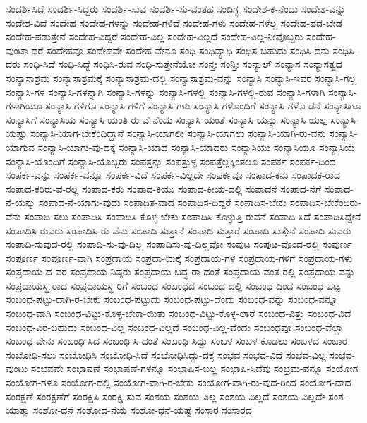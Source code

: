 {ಸಂದರ್ಶಿಸಿದೆ
ಸಂದರ್ಶಿ-ಸಿದ್ದರು
ಸಂದರ್ಶಿ-ಸುವ
ಸಂದರ್ಶಿ-ಸು-ವಂತಹ
ಸಂದಿಗ್ಧ
ಸಂದೇಶ-ಕ-ನೆಂದು
ಸಂದೇಶ-ವನ್ನು
ಸಂದೇಶ-ವಿದೆ
ಸಂದೇಹ
ಸಂದೇಹ-ಗಳನ್ನು
ಸಂದೇಹ-ಗಳಿವೆ
ಸಂದೇಹ-ಗಳು
ಸಂದೇಹ-ಗಳೆಲ್ಲ
ಸಂದೇಹ-ಪಡ-ಬೇಡ
ಸಂದೇಹ-ಪಡುತ್ತೇನೆ
ಸಂದೇಹ-ವಿದ್ದರೆ
ಸಂದೇಹ-ವಿಲ್ಲ
ಸಂದೇಹ-ವಿಲ್ಲದೆ
ಸಂದೇಹ-ವಿಲ್ಲ-ನೀವೊಬ್ಬರು
ಸಂದೇಹ-ವುಂಟಾ-ದರೆ
ಸಂದೇಹವೂ
ಸಂದೇಹವೇ
ಸಂದೇಹ-ವೇನೂ
ಸಂಧಿ
ಸಂಧಿವ್ಯಾಧಿ
ಸಂಧಿಸ-ಬಹುದು
ಸಂಧಿಸಿ-ದನು
ಸಂಧಿಸಿ-ದರು
ಸಂಧಿ-ಸಿದೆ
ಸಂಧಿ-ಸಿದ್ದೆ
ಸಂಧಿಸಿ-ರುವ
ಸಂಧಿ-ಸುತ್ತೇನೆಯೋ
ಸಂನ್ತಃ
ಸಂನ್ತಿಃ
ಸಂನ್ಯಾಲ್
ಸಂನ್ಯಾಸ
ಸಂನ್ಯಾಸತ್ವದ
ಸಂನ್ಯಾಸಾಶ್ರಮ
ಸಂನ್ಯಾಸಾಶ್ರಮಕ್ಕೆ
ಸಂನ್ಯಾಸಾಶ್ರಮ-ದಲ್ಲಿ
ಸಂನ್ಯಾಸಾಶ್ರಮ-ವನ್ನು
ಸಂನ್ಯಾಸಿ
ಸಂನ್ಯಾಸಿ-ಇವರ
ಸಂನ್ಯಾಸಿ-ಗಲ್ಲ
ಸಂನ್ಯಾಸಿ-ಗಳ
ಸಂನ್ಯಾಸಿ-ಗಳನ್ನಾಗಿ
ಸಂನ್ಯಾಸಿ-ಗಳನ್ನು
ಸಂನ್ಯಾಸಿ-ಗಳಲ್ಲಿ
ಸಂನ್ಯಾಸಿ-ಗಳಲ್ಲಿ-ರುವ
ಸಂನ್ಯಾಸಿ-ಗಳಾಗಿ
ಸಂನ್ಯಾಸಿ-ಗಳಾಗಿಯೂ
ಸಂನ್ಯಾಸಿ-ಗಳಿಗೂ
ಸಂನ್ಯಾಸಿ-ಗಳಿಗೆ
ಸಂನ್ಯಾಸಿ-ಗಳು
ಸಂನ್ಯಾಸಿ-ಗಳೊಂದಿಗೆ
ಸಂನ್ಯಾಸಿ-ಗಳೊ-ಡನೆ
ಸಂನ್ಯಾಸಿಗೂ
ಸಂನ್ಯಾಸಿಗೆ
ಸಂನ್ಯಾಸಿಯ
ಸಂನ್ಯಾಸಿ-ಯಂತಿ-ರು-ವೆ-ನೆಂದು
ಸಂನ್ಯಾಸಿ-ಯಂತೆ
ಸಂನ್ಯಾಸಿ-ಯನ್ನು
ಸಂನ್ಯಾಸಿ-ಯಲ್ಲ
ಸಂನ್ಯಾಸಿ-ಯಷ್ಟು
ಸಂನ್ಯಾಸಿ-ಯಾಗ-ಬೇಕೆಂದಿದ್ದಾನೆ
ಸಂನ್ಯಾಸಿ-ಯಾಗಲೀ
ಸಂನ್ಯಾಸಿ-ಯಾಗಲು
ಸಂನ್ಯಾಸಿ-ಯಾಗಿ-ರು-ವನು
ಸಂನ್ಯಾಸಿ-ಯಾಗುವ
ಸಂನ್ಯಾಸಿ-ಯಾಗು-ವು-ದಕ್ಕೆ
ಸಂನ್ಯಾಸಿ-ಯಾದ
ಸಂನ್ಯಾಸಿ-ಯಾದರು
ಸಂನ್ಯಾಸಿಯು
ಸಂನ್ಯಾಸಿಯೂ
ಸಂನ್ಯಾಸಿಯೆ
ಸಂನ್ಯಾಸಿ-ಯೊಂದಿಗೆ
ಸಂನ್ಯಾಸಿ-ಯೊಬ್ಬರು
ಸಂಪತ್ತನ್ನು
ಸಂಪತ್ತುಳ್ಳ
ಸಂಪತ್ತೆಲ್ಲಕ್ಕಿಂತಲೂ
ಸಂಪರ್ಕ
ಸಂಪರ್ಕ-ದಿಂದ
ಸಂಪರ್ಕ-ವನ್ನು
ಸಂಪರ್ಕ-ವನ್ನೂ
ಸಂಪರ್ಕ-ವಿದೆ
ಸಂಪರ್ಕ-ವಿಲ್ಲದೇ
ಸಂಪರ್ಕವೂ
ಸಂಪಾದ-ಕನು
ಸಂಪಾದಕ-ರಾದ
ಸಂಪಾದ-ಕರಿರು-ವ-ರಲ್ಲ
ಸಂಪಾದ-ಕರು
ಸಂಪಾದ-ಕಿಯು
ಸಂಪಾದ-ಕೀಯ-ದಲ್ಲಿ
ಸಂಪಾದನೆ
ಸಂಪಾದ-ನೆಗೆ
ಸಂಪಾದ-ನೆ-ಯನ್ನು
ಸಂಪಾದ-ನೆ-ಯಾಗು-ವುದು
ಸಂಪಾದಿತ-ವಾದ
ಸಂಪಾದಿಸ-ದಿದ್ದರೆ
ಸಂಪಾದಿಸ-ಬೇಕು
ಸಂಪಾದಿಸ-ಬೇಕೆಂದಿರು-ವೆನು
ಸಂಪಾದಿ-ಸಲು
ಸಂಪಾದಿಸಿ
ಸಂಪಾದಿಸಿ-ಕೊಳ್ಳ-ಬೇಕು
ಸಂಪಾದಿಸಿ-ಕೊಳ್ಳುತ್ತಿ-ರುವನೆ
ಸಂಪಾದಿ-ಸಿದೆ
ಸಂಪಾದಿಸಿದ್ದೇನೆ
ಸಂಪಾದಿಸಿ-ರುವರು
ಸಂಪಾದಿಸಿ-ರು-ವೆನು
ಸಂಪಾದಿ-ಸುತ್ತಾನೆ
ಸಂಪಾದಿ-ಸುತ್ತಾರೆ
ಸಂಪಾದಿ-ಸುತ್ತೇನೆ
ಸಂಪಾದಿ-ಸುವರು
ಸಂಪಾದಿ-ಸುವುದ-ರಲ್ಲಿ
ಸಂಪಾದಿ-ಸು-ವು-ದಿಲ್ಲ
ಸಂಪಾದಿಸು-ವು-ದಿಲ್ಲವೋ
ಸಂಪುಟ
ಸಂಪುಟ-ವೊಂದ-ರಲ್ಲಿ
ಸಂಪುರ್ಣ
ಸಂಪೂರ್ಣ
ಸಂಪೂರ್ಣ-ವಾಗಿ
ಸಂಪ್ರದಾಯ
ಸಂಪ್ರದಾ-ಯಕ್ಕೆ
ಸಂಪ್ರದಾಯ-ಗಳ
ಸಂಪ್ರದಾಯ-ಗಳಿಗೆ
ಸಂಪ್ರದಾಯ-ಗಳು
ಸಂಪ್ರದಾಯ-ದ-ವರ
ಸಂಪ್ರದಾಯ-ನಿಷ್ಠರು
ಸಂಪ್ರದಾಯ-ಬದ್ಧ-ರಾ-ದಂತೆ
ಸಂಪ್ರದಾಯ-ವಂತ-ರಲ್ಲಿ
ಸಂಪ್ರದಾಯ-ವನ್ನು
ಸಂಪ್ರದಾಯಸ್ಥ-ರಾದ
ಸಂಪ್ರದಾಯಸ್ಥ-ರಿಗೆ
ಸಂಬಂಧ
ಸಂಬಂಧದ
ಸಂಬಂಧ-ದಲ್ಲಿ
ಸಂಬಂಧ-ದಿಂದ
ಸಂಬಂಧ-ಪಟ್ಟ
ಸಂಬಂಧ-ಪಟ್ಟು-ದಾಗಿ-ರ-ಬೇಕು
ಸಂಬಂಧ-ಪಟ್ಟುದು
ಸಂಬಂಧ-ಪಟ್ಟು-ದೆಂದು
ಸಂಬಂಧ-ವನ್ನು
ಸಂಬಂಧ-ವನ್ನೂ
ಸಂಬಂಧ-ವಾಗಿ
ಸಂಬಂಧ-ವಿಟ್ಟು-ಕೊಳ್ಳ-ಬೇಕಾ-ಯಿತು
ಸಂಬಂಧ-ವಿಟ್ಟು-ಕೊಳ್ಳ-ಲಾರೆ
ಸಂಬಂಧ-ವಿತ್ತು
ಸಂಬಂಧ-ವಿದೆ
ಸಂಬಂಧ-ವಿರ-ಬಹುದು
ಸಂಬಂಧ-ವಿಲ್ಲ
ಸಂಬಂಧ-ವಿಲ್ಲದೆ
ಸಂಬಂಧ-ವಿಲ್ಲ-ವೆಂದು
ಸಂಬಂಧವೂ
ಸಂಬಂಧ-ವೆಲ್ಲಾ
ಸಂಬಂಧ-ವೇನು
ಸಂಬಂಧಿ-ಸಿದ
ಸಂಬಂಧಿ-ಸಿ-ದಂತೆ
ಸಂಬಂಧಿ-ಸಿದ್ದು
ಸಂಬಳ
ಸಂಬಳ-ಕೊಡಲು
ಸಂಬಳದ
ಸಂಬಾರ
ಸಂಬೋಧಿ-ಸಲು
ಸಂಬೋಧಿಸಿ
ಸಂಬೋಧಿ-ಸಿದೆ
ಸಂಬೋಧಿಸಿದ್ದು-ದಕ್ಕೆ
ಸಂಭವ
ಸಂಭವ-ವಿದೆ
ಸಂಭವ-ವಿಲ್ಲ
ಸಂಭವ-ವುಂಟು
ಸಂಭವವೇ
ಸಂಭಾಷಣೆ
ಸಂಭಾಷಣೆ-ಗಳನ್ನೂ
ಸಂಭಾಷಿಸ-ಬಲ್ಲ
ಸಂಭಾಷಿ-ಸಿದೆವು
ಸಂಭ್ರಮ-ವನ್ನೂ
ಸಂಯೋಗ
ಸಂಯೋಗ-ಗಳೂ
ಸಂಯೋಗ-ದಲ್ಲಿ
ಸಂಯೋಗ-ವಾಗಿ-ರ-ಬೇಕು
ಸಂಯೋಗ-ವಾಗಿ-ರು-ವುದ-ರಿಂದ
ಸಂಯೋಗ-ವಾದ
ಸಂರಕ್ಷಣೆ
ಸಂರಕ್ಷಣೆಗೆ
ಸಂರಕ್ಷಿಸಿ
ಸಂರಕ್ಷಿ-ಸುವ
ಸಂಶಯ
ಸಂಶಯ-ವಿಲ್ಲ
ಸಂಶಯ-ವಿಲ್ಲದೆ
ಸಂಶಯ-ವಿಲ್ಲದೇ
ಸಂಶ-ಯಾತ್ಮಾ
ಸಂಶೋ-ಧನೆ
ಸಂಶೋಧ-ನೆಯ
ಸಂಶೋ-ಧನೆ-ಯಷ್ಟೆ
ಸಂಸಾರ
ಸಂಸಾರದ
}
